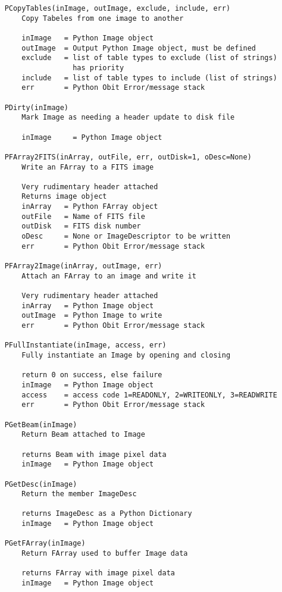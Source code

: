 \documentclass[11pt]{report}
\begin{document}
\begin{verbatim}
    PCopyTables(inImage, outImage, exclude, include, err)
        Copy Tabeles from one image to another
        
        inImage   = Python Image object
        outImage  = Output Python Image object, must be defined
        exclude   = list of table types to exclude (list of strings)
                    has priority
        include   = list of table types to include (list of strings)
        err       = Python Obit Error/message stack
    
    PDirty(inImage)
        Mark Image as needing a header update to disk file
        
        inImage     = Python Image object
    
    PFArray2FITS(inArray, outFile, err, outDisk=1, oDesc=None)
        Write an FArray to a FITS image
        
        Very rudimentary header attached
        Returns image object
        inArray   = Python FArray object
        outFile   = Name of FITS file
        outDisk   = FITS disk number
        oDesc     = None or ImageDescriptor to be written
        err       = Python Obit Error/message stack
    
    PFArray2Image(inArray, outImage, err)
        Attach an FArray to an image and write it
        
        Very rudimentary header attached
        inArray   = Python Image object
        outImage  = Python Image to write
        err       = Python Obit Error/message stack
    
    PFullInstantiate(inImage, access, err)
        Fully instantiate an Image by opening and closing
        
        return 0 on success, else failure
        inImage   = Python Image object
        access    = access code 1=READONLY, 2=WRITEONLY, 3=READWRITE
        err       = Python Obit Error/message stack
    
    PGetBeam(inImage)
        Return Beam attached to Image
        
        returns Beam with image pixel data
        inImage   = Python Image object
    
    PGetDesc(inImage)
        Return the member ImageDesc
        
        returns ImageDesc as a Python Dictionary
        inImage   = Python Image object
    
    PGetFArray(inImage)
        Return FArray used to buffer Image data
        
        returns FArray with image pixel data
        inImage   = Python Image object
    

\end{verbatim}
\end{document}
